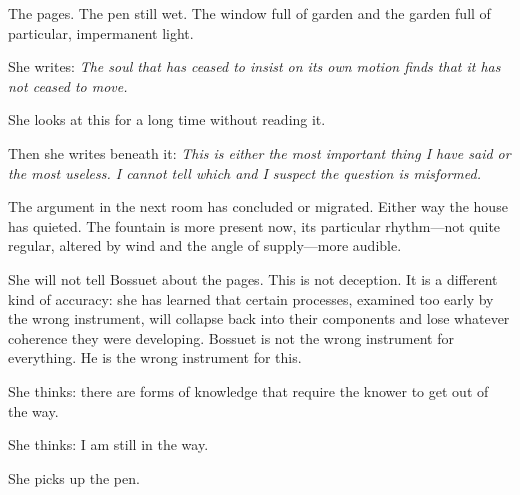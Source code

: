 The pages. The pen still wet. The window full of garden and the
garden full of particular, impermanent light.

She writes: \textit{The soul that has ceased to insist on its own motion
finds that it has not ceased to move.}

She looks at this for a long time without reading it.

Then she writes beneath it: \textit{This is either the most important
thing I have said or the most useless. I cannot tell which and I
suspect the question is misformed.}

\scenebreak

The argument in the next room has concluded or migrated. Either way
the house has quieted. The fountain is more present now, its
particular rhythm---not quite regular, altered by wind and the
angle of supply---more audible.

She will not tell Bossuet about the pages. This is not deception.
It is a different kind of accuracy: she has learned that certain
processes, examined too early by the wrong instrument, will
collapse back into their components and lose whatever coherence
they were developing. Bossuet is not the wrong instrument for
everything. He is the wrong instrument for this.

She thinks: there are forms of knowledge that require the knower
to get out of the way.

She thinks: I am still in the way.

She picks up the pen.

